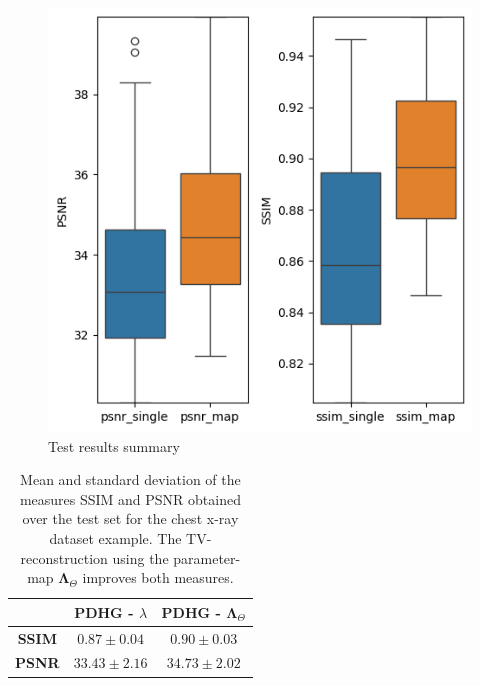 \documentclass[12pt]{article}
\begin{document}















\begin{figure}[H]
  \centering
  \includegraphics[width=0.5\linewidth]{images//chest_xray/box_plots_1.png}
  \caption{Test results summary}
  \label{fig:box_plots}
\end{figure}


\begin{table}[H]

\centering
\begin{tabular}{c|c c}
 & \textbf{PDHG -} $\lambda$ & \textbf{PDHG -} $\mathbf{\Lambda}_{\Theta}$ \\
\hline
\textbf{SSIM} & $0.87 \pm 0.04$ & $\mathbf{0.90} \pm 0.03$ \\
\textbf{PSNR} & $33.43 \pm 2.16$ & $\mathbf{34.73} \pm 2.02$ \\
\end{tabular}

\caption{Mean and standard deviation of the measures SSIM and PSNR obtained over the test set for the chest x-ray dataset example. 
The TV-reconstruction using the parameter-map $\mathbf{\Lambda}_{\Theta}$ improves both measures.
}

\label{table:1}

\end{table}
\end{document}
